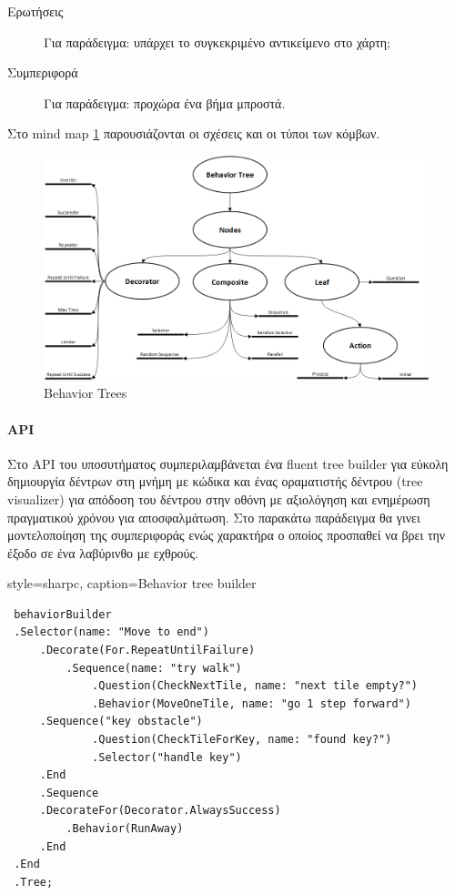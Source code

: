 \begin{description}
	\item [Ερωτήσεις] Για παράδειγμα: υπάρχει το συγκεκριμένο αντικείμενο στο χάρτη;
	\item [Συμπεριφορά] Για παράδειγμα: προχώρα ένα βήμα μπροστά.
\end{description}

Στο mind map \ref{fig:behavior_trees_mind_map} παρουσιάζονται οι σχέσεις και οι τύποι των κόμβων.
\begin{figure}[h!]
	\centering
	\includegraphics[width=165mm]{Images/behavior_trees}
	\caption{Behavior Trees}
	\label{fig:behavior_trees_mind_map}
\end{figure}
	
\paragraph{API}
Στο \gls{API} του υποσυτήματος συμπεριλαμβάνεται ένα fluent tree builder για εύκολη δημιουργία δέντρων στη μνήμη με κώδικα και ένας οραματιστής δέντρου (tree visualizer) για απόδοση του δέντρου στην οθόνη με αξιολόγηση και ενημέρωση πραγματικού χρόνου για αποσφαλμάτωση. Στο παρακάτω παράδειγμα θα γινει μοντελοποίηση της συμπεριφοράς ενώς χαρακτήρα ο οποίος προσπαθεί να βρει την έξοδο σε ένα λαβύρινθο με εχθρούς.

	\lstset
	{
		style=sharpc, 
		caption={Behavior tree builder}
	}
	\begin{lstlisting}	
 behaviorBuilder
 .Selector(name: "Move to end")
	 .Decorate(For.RepeatUntilFailure)
		 .Sequence(name: "try walk")
			 .Question(CheckNextTile, name: "next tile empty?")
			 .Behavior(MoveOneTile, name: "go 1 step forward")
	 .Sequence("key obstacle")
			 .Question(CheckTileForKey, name: "found key?")
			 .Selector("handle key")
	 .End
	 .Sequence
	 .DecorateFor(Decorator.AlwaysSuccess)
		 .Behavior(RunAway)
	 .End
 .End
 .Tree;
	\end{lstlisting}


